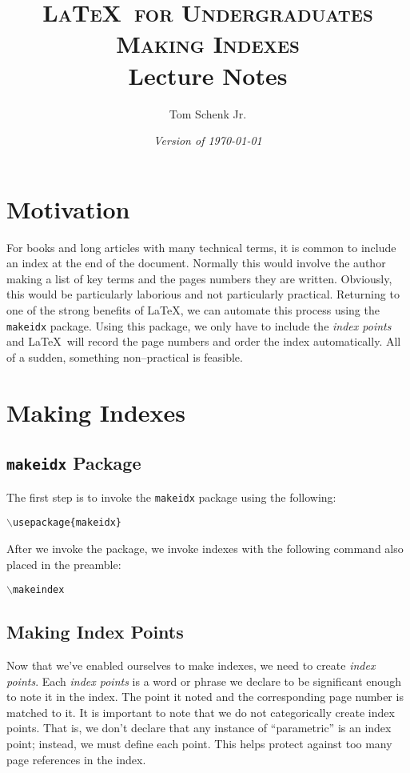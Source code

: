 \documentclass{article}
\title{\textsc{\LaTeX\ for Undergraduates\\
			Making Indexes} \\
			Lecture Notes}
\author{Tom Schenk Jr.}
\date{\textit{Version of \today}}
\begin{document}
\maketitle

\section{Motivation}

For books and long articles with many technical terms, it is common to include an index at the end of the document. Normally this would involve the author making a list of key terms and the pages numbers they are written. Obviously, this would be particularly laborious and not particularly practical. Returning to one of the strong benefits of \LaTeX, we can automate this process using the \texttt{makeidx} package. Using this package, we only have to include the \textit{index points} and \LaTeX\ will record the page numbers and order the index automatically. All of a sudden, something non--practical is feasible.

\section{Making Indexes}

\subsection{\texttt{makeidx} Package}

The first step is to invoke the \texttt{makeidx} package using the following:
\begin{center}
\texttt{$\backslash$usepackage\{makeidx\}}
\end{center}

After we invoke the package, we invoke indexes with the following command also placed in the preamble:
\begin{center}
\texttt{$\backslash$makeindex}
\end{center}

\subsection{Making Index Points}

Now that we've enabled ourselves to make indexes, we need to create \textit{index points}. Each \textit{index points} is a word or phrase we declare to be significant enough to note it in the index. The point it noted and the corresponding page number is matched to it. It is important to note that we do not categorically create index points. That is, we don't declare that any instance of ``parametric'' is an index point; instead, we must define each point. This helps protect against too many page references in the index.
\end{document}
